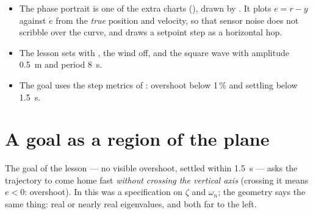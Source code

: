 
\begin{inapp}
\begin{itemize}[leftmargin=1.2em]
  \item The phase portrait is one of the extra charts (), drawn by . It plots $e = r - y$ against $\dot e$ from the \emph{true} position and velocity, so that sensor noise does not scribble over the curve, and draws a setpoint step as a horizontal hop.
  \item The lesson sets  with , the wind off, and the square wave  with amplitude \SI{0.5}{m} and period \SI{8}{s}.
  \item The goal uses the step metrics of : overshoot below 1\,\% and settling below \SI{1.5}{s}.
\end{itemize}
\end{inapp}

\section{A goal as a region of the plane}

The goal of the lesson — no visible overshoot, settled within \SI{1.5}{s} — asks the trajectory to come home fast \emph{without crossing the vertical axis} (crossing it means $e < 0$: overshoot). In  this was a specification on $\zeta$ and $\omega_n$; the geometry says the same thing: real or nearly real eigenvalues, and both far to the left.

